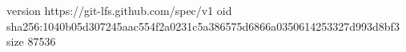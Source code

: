 version https://git-lfs.github.com/spec/v1
oid sha256:1040b05d307245aac554f2a0231c5a386575d6866a0350614253327d993d8bf3
size 87536
